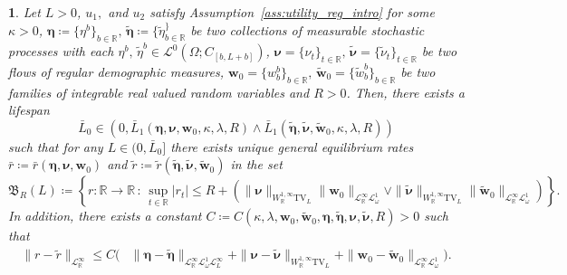\documentclass[11pt,oneside,english,reqno,dvipsnames,table]{amsart}
\numberwithin{equation}{section}
\theoremstyle{plain}
\theoremstyle{definition}
\theoremstyle{remark}
\theoremstyle{plain}
\theoremstyle{plain}
\newtheorem{prop}[thm]{\protect\propositionname}
\theoremstyle{plain}
\theoremstyle{plain}
\theoremstyle{plain}
\theoremstyle{plain}
\theoremstyle{plain}
\providecommand{\propositionname}{Proposition}
\newcommand{\TV}{\text{TV}}
\newcommand{\bw}{\mathbf{w}}
\newcommand{\mbR}{\mathbb{R}}
\newcommand{\mfB}{\mathfrak{B}}
\newcommand{\msL}{\mathscr{L}}
\newcommand{\bmeta}{\boldsymbol{\eta}}
\newcommand{\bnu}{\boldsymbol{\nu}}
\numberwithin{thm}{section}
\begin{document}
\begin{prop}\label{prop:olg_rate_stable}
%
 Let $L>0$, $u_1,$ and $u_2$ satisfy Assumption~\ref{ass:utility_reg_intro} for some $\kappa>0$, $\bmeta \coloneqq \{\eta^b\}_{b\in \mbR},\, \tilde{\bmeta} \coloneqq \{\tilde{\eta}^\}_{b\in \mbR}$ be two collections of measurable stochastic processes with each $\eta^b,\, \tilde{\eta}^b\in \msL^0(\Omega;C_{[b,L+b]})$, $\bnu = \{\nu_t\}_{t\in \mbR},\, \tilde{\bnu} = \{\tilde{\nu}_t\}_{t\in \mbR}$ be two flows of \emph{regular demographic measures}, $\bw_0  = \{w^b_b\}_{b\in \mbR},\, \tilde{\bw}_0  = \{\tilde{w}^b_b\}_{b\in \mbR}$ be two families of integrable real valued random variables and $R>0$. Then, there exists a lifespan 
 \begin{equation*}
     \bar{L}_0 \in \left(0,\bar{L}_1(\bmeta,\bnu,\bw_0,\kappa,\lambda,R)\wedge \bar{L}_1(\tilde{\bmeta}, \tilde{\bnu}, \tilde{\bw}_0,\kappa,\lambda,R) \right)
 \end{equation*}
 such that for any $L\in (0,\bar{L}_0]$ there exists unique general equilibrium rates $\bar{r}\coloneqq \bar{r}(\bmeta,\bnu,\bw_0)$ and $\tilde{r}\coloneqq \tilde{r}(\tilde{\bmeta},\tilde{\bnu},\tilde{\bw}_0)$ in the set
 \begin{equation*}
     \mfB_R(L)\coloneq \left\{ r: \mbR\to \mbR\,:\, \sup_{t\in \mbR}|r_t| \leq R+ \left(\|\bnu\|_{W^{1,\infty}_{\mbR} \text{TV}_L} \|\bw_0\|_{\msL^\infty_{\mbR}\msL^1_{\omega}} \vee \|\tilde{\bnu}\|_{W^{1,\infty}_{\mbR} \text{TV}_L} \|\tilde{\bw}_0\|_{\msL^\infty_{\mbR}\msL^1_{\omega}} \right)\right\}.
 \end{equation*}
 In addition, there exists a constant $C\coloneqq C(\kappa,\lambda,\bw_0,\tilde{\bw}_0,\bmeta,\tilde{\bmeta},\bnu,\tilde{\bnu},R)>0$ such that
%
\begin{equation}\label{eq:olg_rate_stability}
\begin{aligned}
    \|r-\tilde{r}\|_{\msL^\infty_\mbR} \leq C \bigg(& \|\bmeta-\tilde{\bmeta}\|_{\msL^\infty_{\mbR} \msL^1_\omega \msL^\infty_L} +\|\bnu-\tilde{\bnu}\|_{W^{1,\infty}_{\mbR}\TV_L} + \|\bw_0-\tilde{\bw}_0\|_{\msL^\infty_{\mbR}\msL^1_\omega} \bigg).
    \end{aligned}
\end{equation}
%
\end{prop}
%
\end{document}
